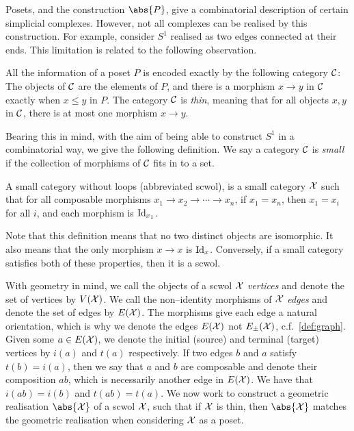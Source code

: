 Posets, and the construction $\abs{P}$, give a combinatorial description of certain simplicial complexes.
However, not all complexes can be realised by this construction.
For example, consider $S^1$ realised as two edges connected at their ends.
This limitation is related to the following observation.

\begin{observation}
	All the information of a poset $P$ is encoded exactly by the following category $\mathcal{C}$:
	The objects of  $\mathcal{C}$ are the elements of  $P$, and there is a morphism  $x \to y$ in  $\mathcal{C}$ exactly when  $x \leq y$ in $P$.
	The category $\mathcal{C}$ is \emph{thin}, meaning that for all objects $x,y$ in  $\mathcal{C}$, there is at most one morphism  $x \to y$.
\end{observation}
Bearing this in mind, with the aim of being able to construct $S^1$ in a combinatorial way, we give the following definition.
We say a category $\mathcal{C}$ is \emph{small} if the collection of morphisms of $\mathcal{C}$ fits in to a set.

\begin{definition}
	A small category without loops (abbreviated scwol), is a small category $\mathcal{X}$ such that for all composable morphisms $x_1 \to x_2 \to \cdots \to x_n$, if $x_1=x_n$, then $x_1=x_i$ for all $i$, and each morphism is $\operatorname{Id}_{x_1}$.
	\label{def:scwol}
\end{definition}

Note that this definition means that no two distinct objects are isomorphic.
It also means that the only morphism $x \to x$ is $\operatorname{Id}_x$.
Conversely, if a small category satisfies both of these properties, then it is a scwol.

With geometry in mind, we call the objects of a scwol $\mathcal{X}$ \emph{vertices} and denote the set of vertices by $V(\mathcal{X})$.
We call the non--identity morphisms of  $\mathcal{X}$ \emph{edges} and denote the set of edges by $E(\mathcal{X})$.
The morphisms give each edge a natural orientation, which is why we denote the edges $E(\mathcal{X})$ not $E_\pm(\mathcal{X})$, c.f.~\cref{def:graph}.
Given some $a \in E(\mathcal{X})$, we denote the initial (source) and terminal (target) vertices by $i(a)$ and $t(a)$ respectively.
If two edges $b$ and $a$ satisfy $t(b)=i(a)$, then we say that $a$ and $b$ are composable and denote their composition $ab$, which is necessarily another edge in $E(\mathcal{X})$.
We have that $i(ab) = i(b)$ and $t(ab) = t(a)$.
We now work to construct a geometric realisation $\abs{\calx}$ of a scwol $\mathcal{X}$, such that if $\mathcal{X}$ is thin, then $\abs{\calx}$ matches the geometric realisation when considering $\mathcal{X}$ as a poset.

